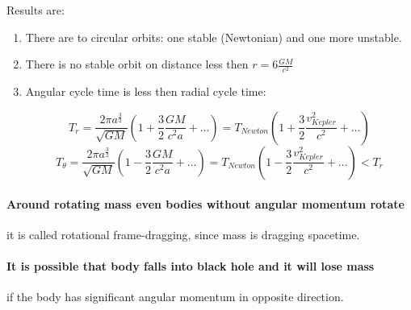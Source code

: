 Results are:

\begin{enumerate}
	\item There are to circular orbits: one stable (Newtonian) and one more unstable.
	\item There is no stable orbit on distance less then $r= 6\frac{GM}{c^2}$
	\item Angular cycle time is less then radial cycle time:
	
	$$ T_{r} = \frac{2\pi a^{\frac{3}{2}}}{\sqrt{GM}}\left(1 + \frac{3}{2}\frac{GM}{c^2 a} + \dots\right)  = T_{Newton}\left(1 + \frac{3}{2}\frac{v_{Kepler}^2}{c^2} + \dots\right) $$
	$$T_{\theta} = \frac{2\pi a^{\frac{3}{2}}}{\sqrt{GM}}\left(1- \frac{3}{2}\frac{GM}{c^2 a} + \dots\right) = T_{Newton}\left(1- \frac{3}{2}\frac{v_{Kepler}^2}{c^2} + \dots\right) < T_{r}$$
\end{enumerate}
\paragraph{Around rotating mass even bodies without angular momentum rotate} it is called rotational frame-dragging, since mass is dragging spacetime.
\paragraph{It is possible that body falls into black hole and it will lose mass} if the body has significant angular momentum in opposite direction.
